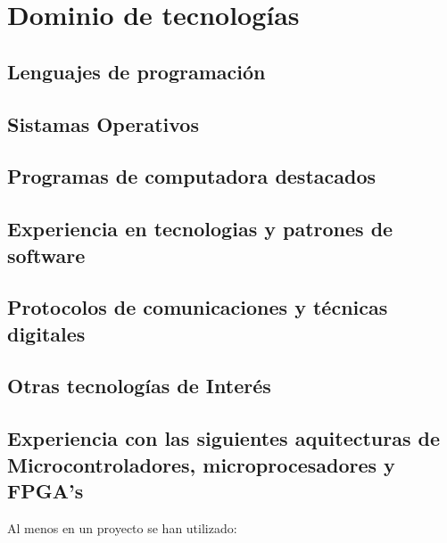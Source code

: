 
\section{Dominio de tecnologías}
   \subsection{Lenguajes de programación}
      \cvitem { \dicadvanced }{\proglangadvanced }
      \cvitem { \dicmedium   }{\proglangmedium   }
      \cvitem { \dicbasic    }{\proglangbasic    }

   \subsection{Sistamas Operativos}
      \cvitem { \dicadvanced } { \osadvanced }
      \cvitem { \dicmedium   } { \osmedium   }
      \cvitem { \dicbasic    } { \osbasic    }

   \subsection{Programas de computadora destacados}
      \cvitem { \dicadvanced } { \computerprogadvanced }
      \cvitem { \dicmedium   } { \computerprogmedium   }
      \cvitem { \dicbasic    } { \computerprogbasic    }

   \subsection{Experiencia en tecnologias y patrones de software}
      \cvitem { \dicadvanced } { \softtechadvanced }
      \cvitem { \dicmedium   } { \softtechmedium   }
      \cvitem { \dicbasic    } { \softtechbasic    }

   \subsection{Protocolos de comunicaciones y técnicas digitales}
      \cvitem{\dicadvanced }{ \protocoladvanced }
      \cvitem{\dicmedium   }{ \protocolmedium   }
      \cvitem{\dicbasic    }{ \protocolbasic    }

   \subsection{Otras tecnologías de Interés}
      \cvitem{\dicadvanced} { \othertechadvanced }
      \cvitem{\dicmedium  } { \othertechmedium   }
      \cvitem{\dicbasic   } { \othertechbasic    }

   \subsection{Experiencia con las siguientes aquitecturas de Microcontroladores, microprocesadores y FPGA's}
      \cvitem {} {Al menos en un proyecto se han utilizado:}

